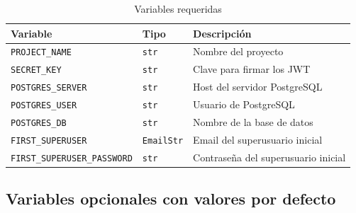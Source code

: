 \begin{longtable}[]{@{}
  >{\raggedright\arraybackslash}p{}
  >{\raggedright\arraybackslash}p{}
  >{\raggedright\arraybackslash}p{}@{}}
\caption[Variables requeridas]{Variables requeridas}\tabularnewline
\toprule\noalign{}
\begin{minipage}[b]{\linewidth}\raggedright
Variable
\end{minipage} & \begin{minipage}[b]{\linewidth}\raggedright
Tipo
\end{minipage} & \begin{minipage}[b]{\linewidth}\raggedright
Descripción
\end{minipage} \\
\midrule\noalign{}
\endhead
\bottomrule\noalign{}
\endlastfoot
\texttt{PROJECT\_NAME} & \texttt{str} & Nombre del proyecto \\
\texttt{SECRET\_KEY} & \texttt{str} & Clave para firmar los JWT \\
\texttt{POSTGRES\_SERVER} & \texttt{str} & Host del servidor PostgreSQL \\
\texttt{POSTGRES\_USER} & \texttt{str} & Usuario de PostgreSQL \\
\texttt{POSTGRES\_DB} & \texttt{str} & Nombre de la base de datos \\
\texttt{FIRST\_SUPERUSER} & \texttt{EmailStr} & Email del superusuario inicial \\
\texttt{FIRST\_SUPERUSER\_PASSWORD} & \texttt{str} & Contraseña del superusuario inicial \\
\end{longtable}

\subsection{Variables opcionales con valores por defecto}\label{variables-opcionales-con-valores-por-defecto}

